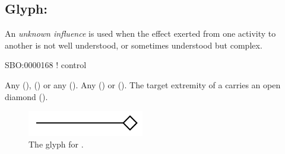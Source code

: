 \subsection{Glyph: }
\label{sec:af:unknown_infl}

An \emph{unknown influence} is used when the effect exerted from one activity to another is not well understood, or sometimes understood but complex.

\begin{glyphDescription}

\glyphSboTerm SBO:0000168 ! control

 \glyphOrigin Any  (),   () or any  ().
 \glyphTarget Any  () or  ().
 \glyphEndPoint The target extremity of a  carries an open diamond ().

\end{glyphDescription}

\begin{figure}[H]
  \centering
  \includegraphics[width = 2in]{images/unknownInfluence}
  \caption{The \AF glyph for .}
  \label{fig:af:unknownInfl}
\end{figure}

